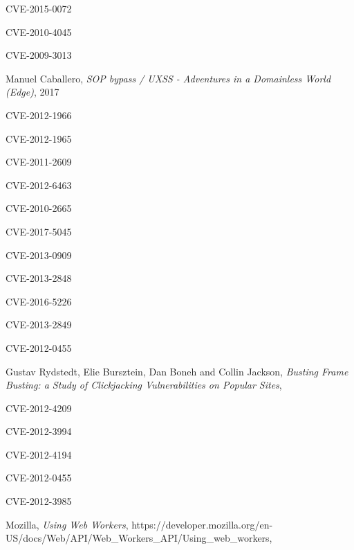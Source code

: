 \documentclass[journal]{IEEEtran}
\begin{document}
\begin{thebibliography}{1}
CVE-2015-0072

CVE-2010-4045

CVE-2009-3013

Manuel Caballero,
\textit{SOP bypass / UXSS - Adventures in a Domainless World (Edge)},
2017

CVE-2012-1966

CVE-2012-1965

CVE-2011-2609

CVE-2012-6463

CVE-2010-2665

CVE-2017-5045

CVE-2013-0909

CVE-2013-2848

CVE-2016-5226

CVE-2013-2849

CVE-2012-0455

Gustav Rydstedt, Elie Bursztein, Dan Boneh and Collin Jackson,
\textit{Busting Frame Busting:
a Study of Clickjacking Vulnerabilities on Popular Sites},

CVE-2012-4209

CVE-2012-3994

CVE-2012-4194

CVE-2012-0455

CVE-2012-3985

Mozilla,
\textit{Using Web Workers},
https://developer.mozilla.org/en-US/docs/Web/API/Web\_Workers\_API/Using\_web\_workers,


\end{thebibliography}

\ifCLASSOPTIONcaptionsoff
  \newpage
\fi
\end{document}
